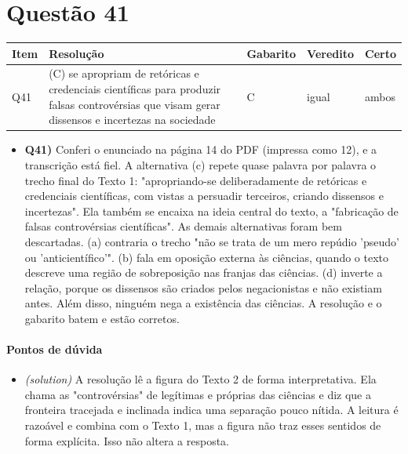 \documentclass{article}%
\begin{document}
\section*{Questão 41}%
\begin{longtable}{@{}p{} p{} p{} p{} p{}@{}}\toprule Item & Resolução & Gabarito & Veredito & Certo \\ \midrule
Q41 & (C) se apropriam de retóricas e credenciais científicas para produzir falsas controvérsias que visam gerar dissensos e incertezas na sociedade & C & igual & ambos \\
\bottomrule\end{longtable}%
\begin{itemize}%
\item%
\textbf{Q41)} Conferi o enunciado na página 14 do PDF (impressa como 12), e a transcrição está fiel. A alternativa (c) repete quase palavra por palavra o trecho final do Texto 1: "apropriando{-}se deliberadamente de retóricas e credenciais científicas, com vistas a persuadir terceiros, criando dissensos e incertezas". Ela também se encaixa na ideia central do texto, a "fabricação de falsas controvérsias científicas". As demais alternativas foram bem descartadas. (a) contraria o trecho "não se trata de um mero repúdio 'pseudo' ou 'anticientífico'". (b) fala em oposição externa às ciências, quando o texto descreve uma região de sobreposição nas franjas das ciências. (d) inverte a relação, porque os dissensos são criados pelos negacionistas e não existiam antes. Além disso, ninguém nega a existência das ciências. A resolução e o gabarito batem e estão corretos.%
\end{itemize}%
\paragraph{Pontos de dúvida}%
\begin{itemize}%
\item%
\textit{(solution)} A resolução lê a figura do Texto 2 de forma interpretativa. Ela chama as "controvérsias" de legítimas e próprias das ciências e diz que a fronteira tracejada e inclinada indica uma separação pouco nítida. A leitura é razoável e combina com o Texto 1, mas a figura não traz esses sentidos de forma explícita. Isso não altera a resposta.%
\end{itemize}%
\end{document}
